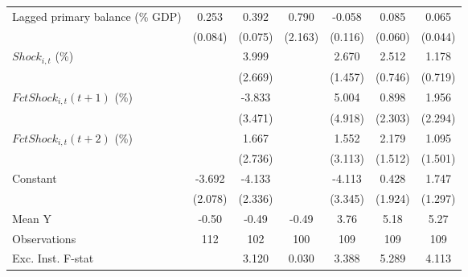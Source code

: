 {\begin{tabular}{l*{6}{c}}
\addlinespace
Lagged primary balance (\% GDP)&       0.253\sym{***}&       0.392\sym{***}&       0.790         &      -0.058         &       0.085         &       0.065         \\
                    &     (0.084)         &     (0.075)         &     (2.163)         &     (0.116)         &     (0.060)         &     (0.044)         \\
\addlinespace
$ Shock_{i,t}$ (\%) &                     &       3.999         &                     &       2.670\sym{*}  &       2.512\sym{***}&       1.178         \\
                    &                     &     (2.669)         &                     &     (1.457)         &     (0.746)         &     (0.719)         \\
\addlinespace
$ FctShock_{i,t}(t+1)$ (\%)&                     &      -3.833         &                     &       5.004         &       0.898         &       1.956         \\
                    &                     &     (3.471)         &                     &     (4.918)         &     (2.303)         &     (2.294)         \\
\addlinespace
$ FctShock_{i,t}(t+2)$ (\%)&                     &       1.667         &                     &       1.552         &       2.179         &       1.095         \\
                    &                     &     (2.736)         &                     &     (3.113)         &     (1.512)         &     (1.501)         \\
\addlinespace
Constant            &      -3.692\sym{*}  &      -4.133         &                     &      -4.113         &       0.428         &       1.747         \\
                    &     (2.078)         &     (2.336)         &                     &     (3.345)         &     (1.924)         &     (1.297)         \\
\midrule
Mean Y              &       -0.50         &       -0.49         &       -0.49         &        3.76         &        5.18         &        5.27         \\
Observations        &         112         &         102         &         100         &         109         &         109         &         109         \\
Exc. Inst. F-stat   &                     &       3.120         &       0.030         &       3.388         &       5.289         &       4.113         \\
\bottomrule
\end{tabular}
}
